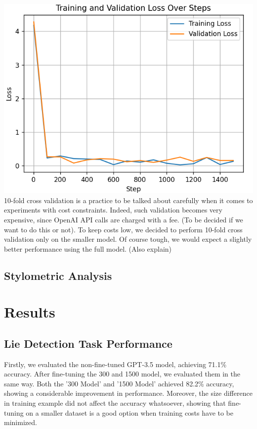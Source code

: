 \documentclass[10pt,twocolumn,letterpaper]{article}
\begin{document}
\includegraphics*[scale=0.55]{img/training_loss.png} \\


10-fold cross validation is a practice to be talked about carefully when it comes to experiments with cost constraints.
Indeed, such validation becomes very expensive, since OpenAI API calls are charged with a fee.
(To be decided if we want to do this or not). To keep costs low, we decided to perform 10-fold cross validation only on
the smaller model. Of course tough, we would expect a slightly better performance using the full model. (Also explain)

\subsection{Stylometric Analysis}

\section{Results}

\subsection{Lie Detection Task Performance}

Firstly, we evaluated the non-fine-tuned GPT-3.5 model, achieving 71.1\% accuracy.
After fine-tuning the 300 and 1500 model, we evaluated them in the same way.
Both the '300 Model' and '1500 Model' achieved 82.2\% accuracy, showing a considerable
improvement in performance. Moreover, the size difference in training example did not
affect the accuracy whatsoever, showing that fine-tuning on a smaller dataset is a good
option when training costs have to be minimized.
\end{document}
